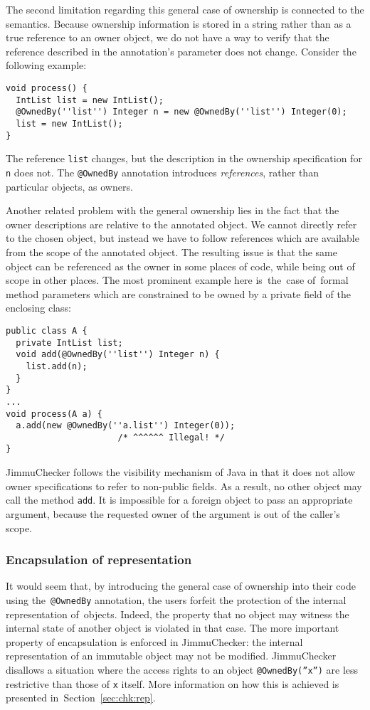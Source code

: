 \documentclass{pracamgr}
\theoremstyle{break}
\theoremstyle{break}
\theoremstyle{break}
\begin{document}
The second limitation regarding this general case of ownership is
connected to the semantics. Because ownership information is stored in
a string rather than as a true reference to an owner object, we do not
have a way to verify that the reference described in the annotation's
parameter does not change. Consider the following example:
\begin{lstlisting}
void process() {
  IntList list = new IntList();
  @OwnedBy(''list'') Integer n = new @OwnedBy(''list'') Integer(0);
  list = new IntList();
}
\end{lstlisting}
The reference \texttt{list} changes, but the description in the
ownership specification for \texttt{n} does not. The \texttt{@OwnedBy}
annotation introduces \emph{references}, rather than particular
objects, as owners.

Another related problem with the general ownership lies in the fact
that the owner descriptions are relative to the annotated object. We
cannot directly refer to the chosen object, but instead we have to
follow references which are available from the scope of the annotated
object. The resulting issue is that the same object can be referenced
as the owner in some places of code, while being out of scope in other
places. The most prominent example here is~the~case of~formal method
parameters which are constrained to be owned by a private field of the
enclosing class:
\begin{lstlisting}
public class A {
  private IntList list;
  void add(@OwnedBy(''list'') Integer n) {
    list.add(n);
  }
}
...
void process(A a) {
  a.add(new @OwnedBy(''a.list'') Integer(0)); 
                      /* ^^^^^^ Illegal! */
}
\end{lstlisting}
JimmuChecker follows the visibility mechanism of Java in that it does
not allow owner spe\-ci\-fi\-ca\-tions to refer to non-public fields.
As a result, no other object may call the method \texttt{add}. It is
impossible for a foreign object to pass an appropriate argument,
because the requested owner of the argument is out of the caller's
scope.

\subsubsection{Encapsulation of representation}

It would seem that, by introducing the general case of ownership into
their code using the~\texttt{@OwnedBy} annotation, the users forfeit
the protection of the internal representation of~objects. Indeed, the
property that no object may witness the internal state of another
object is violated in that case. The more important property of
encapsulation is enforced in JimmuChecker: the internal
representation of an immutable object may not be
modified. JimmuChecker disallows a situation where the access rights
to an object \texttt{@OwnedBy(''x'')} are less restrictive than those
of \texttt{x} itself. More information on how this is achieved is
presented in~Section~\ref{sec:chk:rep}.
\end{document}
